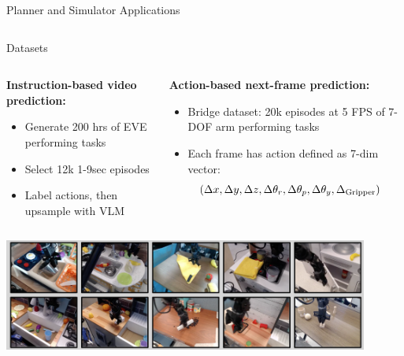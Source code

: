 \documentclass{beamer}
\begin{document}
\begin{frame}{Planner and Simulator Applications}
\begin{columns}[t]
\begin{column}{.5\textwidth}
\begin{center}
            \end{center}
		\end{column}
	\end{columns}

\end{frame}

\begin{frame}{Datasets}
    \vspace{-1em}
	\begin{columns}[t]
		\begin{column}{.5\textwidth}
            \small
            \textbf{Instruction-based video prediction:}
            \begin{itemize}[label=-]
                \item Generate 200 hrs of EVE performing tasks
                \item Select 12k 1-9sec episodes
                \item Label actions, then upsample with VLM
            \end{itemize}
		\end{column}
		\begin{column}{.5\textwidth}
            \small
            \textbf{Action-based next-frame prediction:}
            \begin{itemize}[label=-]
                \item Bridge dataset: 20k episodes at 5 FPS of 7-DOF arm performing tasks
                \item Each frame has action defined as 7-dim vector: \[\hspace{-1em}(\Delta x, \Delta y, \Delta z, \Delta \theta_r, \Delta \theta_p, \Delta \theta_y, \Delta_{\text{Gripper}})\]
            \end{itemize}
		\end{column}
	\end{columns}
    \begin{center}
        \includegraphics[width=0.9\textwidth]{./img/post_ds.png}
    \end{center}
\end{frame}
\end{document}
